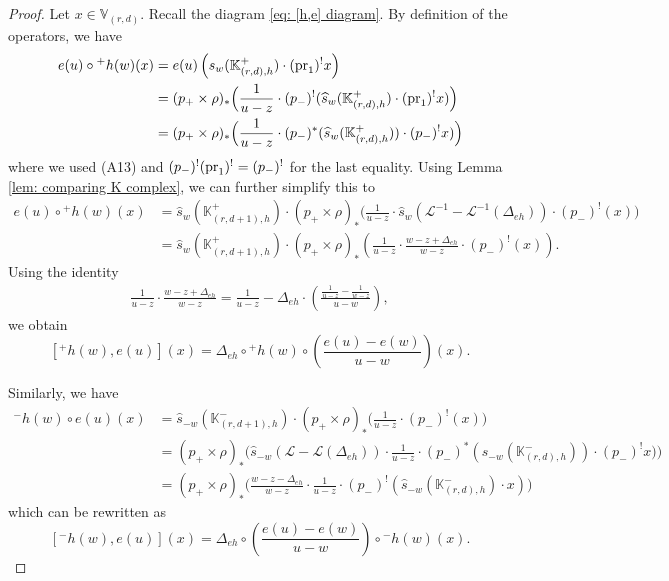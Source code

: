 \documentclass[10pt]{amsart}
\newcommand{\BK}{\mathbb{K}}
\newcommand{\BV}{\mathbb{V}}
\newcommand{\CL}{\mathcal{L}}
\newcommand{\pr}{\textnormal{pr}}
\newcommand{\+}{{}^+}
\theoremstyle{definition}
\theoremstyle {definition}
\theoremstyle {definition}
\begin{document}
\begin{proof}
Let $x\in \BV_{(r,d)}$. Recall the diagram \eqref{eq: [h,e] diagram}. By definition of the operators, we have
\begin{align*}
    e(u)\circ {}^{+}h(w)(x)
    &=e(u)\left(s_w(\BK^+_{(r,d),h})\cdot (\pr_1)^!x\right)\\
    &=(p_+\times \rho)_*\Big(\frac{1}{u-z}\cdot (p_-)^!(\widehat s_w(\BK^+_{(r,d),h})\cdot (\pr_1)^!x)\Big)\\
    &=(p_+\times \rho)_*\Big(\frac{1}{u-z}\cdot (p_-)^*(\widehat s_w(\BK^+_{(r,d),h}))\cdot (p_-)^!x)\Big)
\end{align*}
where we used (A13) and $(p_-)^!(\pr_1)^!=(p_-)^!$ for the last equality. Using Lemma \ref{lem: comparing K complex}, we can further simplify this to 
\begin{align*}
    e(u)\circ {}^{+}h(w)(x)
    &=\widehat s_w(\BK^+_{(r,d+1),h})\cdot (p_+\times \rho)_*\Big(\frac{1}{u-z}\cdot \widehat s_w(\CL^{-1} - \CL^{-1}(\Delta_{eh}))\cdot  (p_-)^!(x)\Big)\\
    &=\widehat s_w(\BK^+_{(r,d+1),h})\cdot (p_+\times \rho)_*\left(\frac{1}{u-z}\cdot \frac{w- z+\Delta_{eh}}{w- z} \cdot (p_-)^!(x)\right).
\end{align*}
Using the identity
\begin{align*}
    \frac{1}{u-z}\cdot \frac{w- z+\Delta_{eh}}{w- z}=\frac{1}{u-z}-\Delta_{eh}\cdot \left(\frac{\frac{1}{u-z}-\frac{1}{w-z}}{u-w}\right), 
\end{align*}
we obtain
$$[{}^{+}h(w), e(u)](x)=\Delta_{eh}\circ {}^{+}h(w)\circ\left(\frac{e(u)-e(w)}{u-w}
\right)(x).
$$

Similarly, we have
\begin{align*}
{}^{-}h(w)\circ e(u) (x)
&=\widehat s_{-w}(\BK^-_{(r,d+1),h})\cdot (p_+\times \rho)_*\Big(
\frac{1}{u-z}\cdot (p_-)^!(x)\Big)\\
&=(p_+\times \rho)_*\Big(
\widehat s_{-w}(\CL-\CL(\Delta_{eh}))\cdot
\frac{1}{u-z}\cdot (p_-)^*(s_{-w}(\BK^-_{(r,d),h}))\cdot (p_-)^!x)\Big)\\
&=(p_+\times \rho)_*\Big(
\frac{w-z-\Delta_{eh}}{w-z}
\cdot \frac{1}{u-z}\cdot (p_-)^!(\widehat s_{-w}(\BK^-_{(r,d),h})\cdot x)\Big)
\end{align*}
which can be rewritten as 
$$[{}^{-}h(w), e(u)](x)=\Delta_{eh}\circ \left(\frac{e(u)-e(w)}{u-w}\right)\circ {}^{-}h(w)(x).
$$






\end{proof}
\end{document}

